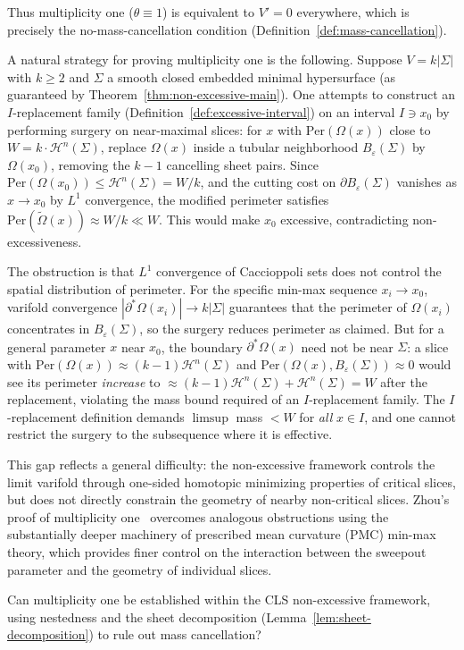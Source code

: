 Thus multiplicity one ($\theta \equiv 1$) is equivalent to $V' = 0$ everywhere, which is precisely the no-mass-cancellation condition (Definition~\ref{def:mass-cancellation}).

A natural strategy for proving multiplicity one is the following. Suppose $V = k|\Sigma|$ with $k \geq 2$ and $\Sigma$ a smooth closed embedded minimal hypersurface (as guaranteed by Theorem~\ref{thm:non-excessive-main}). One attempts to construct an $I$-replacement family (Definition~\ref{def:excessive-interval}) on an interval $I \ni x_0$ by performing surgery on near-maximal slices: for $x$ with $\mathrm{Per}(\Omega(x))$ close to $W = k \cdot \mathcal{H}^n(\Sigma)$, replace $\Omega(x)$ inside a tubular neighborhood $B_\varepsilon(\Sigma)$ by $\Omega(x_0)$, removing the $k - 1$ cancelling sheet pairs. Since $\mathrm{Per}(\Omega(x_0)) \leq \mathcal{H}^n(\Sigma) = W/k$, and the cutting cost on $\partial B_\varepsilon(\Sigma)$ vanishes as $x \to x_0$ by $L^1$ convergence, the modified perimeter satisfies $\mathrm{Per}(\tilde{\Omega}(x)) \approx W/k \ll W$. This would make $x_0$ excessive, contradicting non-excessiveness.

The obstruction is that $L^1$ convergence of Caccioppoli sets does not control the spatial distribution of perimeter. For the specific min-max sequence $x_i \to x_0$, varifold convergence $|\partial^*\Omega(x_i)| \to k|\Sigma|$ guarantees that the perimeter of $\Omega(x_i)$ concentrates in $B_\varepsilon(\Sigma)$, so the surgery reduces perimeter as claimed. But for a general parameter $x$ near $x_0$, the boundary $\partial^*\Omega(x)$ need not be near $\Sigma$: a slice with $\mathrm{Per}(\Omega(x)) \approx (k-1)\mathcal{H}^n(\Sigma)$ and $\mathrm{Per}(\Omega(x), B_\varepsilon(\Sigma)) \approx 0$ would see its perimeter \emph{increase} to $\approx (k-1)\mathcal{H}^n(\Sigma) + \mathcal{H}^n(\Sigma) = W$ after the replacement, violating the mass bound required of an $I$-replacement family. The $I$-replacement definition demands $\limsup$ mass $< W$ for \emph{all} $x \in I$, and one cannot restrict the surgery to the subsequence where it is effective.

This gap reflects a general difficulty: the non-excessive framework controls the limit varifold through one-sided homotopic minimizing properties of critical slices, but does not directly constrain the geometry of nearby non-critical slices. Zhou's proof of multiplicity one~\cite{Zho20} overcomes analogous obstructions using the substantially deeper machinery of prescribed mean curvature (PMC) min-max theory, which provides finer control on the interaction between the sweepout parameter and the geometry of individual slices.

\begin{question}\label{q:mult-one}
Can multiplicity one be established within the CLS non-excessive framework, using nestedness and the sheet decomposition (Lemma~\ref{lem:sheet-decomposition}) to rule out mass cancellation?
\end{question}
